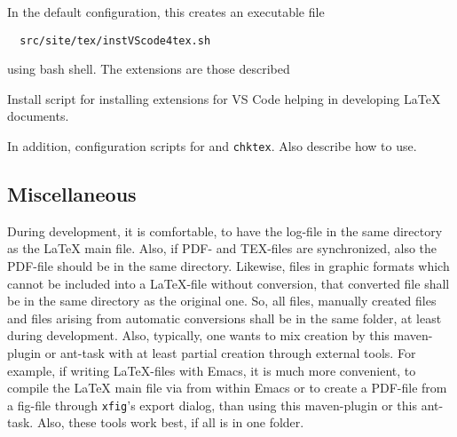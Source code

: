 \noindent
In the default configuration, this creates an executable file 
%
\begin{verbatim}
  src/site/tex/instVScode4tex.sh
\end{verbatim}
%
using bash shell. 
The extensions are those described 



Install script for installing extensions for VS Code 
helping in developing \LaTeX{} documents. 


In addition, configuration scripts for  and \texttt{chktex}. 
Also describe how to use. 



\subsection{Miscellaneous}



During development, it is comfortable, 
to have the log-file in the same directory as the \LaTeX{} main file. 
Also, if PDF- and TEX-files are synchronized, 
also the PDF-file should be in the same directory. 
Likewise, files in graphic formats 
which cannot be included into a \LaTeX-file without conversion, 
that converted file shall be in the same directory as the original one. 
So, all files, manually created files 
and files arising from automatic conversions 
shall be in the same folder, at least during development. 
Also, typically, one wants to mix creation by this maven-plugin or ant-task 
with at least partial creation through external tools. 
For example, if writing \LaTeX-files with Emacs, 
it is much more convenient, to compile the \LaTeX{} main file 
via \pdflatex{} from within Emacs 
or to create a PDF-file from a \gls{fig}-file 
through \texttt{xfig}'s export dialog, 
than using this maven-plugin or this ant-task. 
Also, these tools work best, if all is in one folder. 

